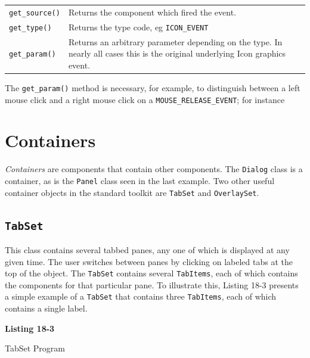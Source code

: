 \vspace{0.15in}
\begin{xtabular}{m{1.2in} m{4.7in}}
\texttt{get\_source()} & Returns the component which fired the event.\\
\texttt{get\_type()} & Returns the type code, eg \texttt{ICON\_EVENT}\\
\texttt{get\_param()} &
Returns an arbitrary parameter depending on the type. In
nearly all cases this is the original underlying Icon graphics event.\\
\end{xtabular}
\vspace{0.15in}

The \texttt{get\_param()} method is necessary, for example, to
distinguish between a left mouse click and a right mouse click on a
\texttt{MOUSE\_RELEASE\_EVENT}; for instance 


\section{Containers}

\textit{Containers} are components that contain other components.
The \texttt{Dialog} class is a container, as is
the \texttt{Panel} class seen in the last example.
Two other useful container objects in the standard toolkit are \texttt{TabSet}
and \texttt{OverlaySet}.

\subsection*{\texttt{TabSet}}

This class contains several tabbed panes, any one of which
is displayed at any given time. The user switches between panes by clicking on
labeled tabs at the top of the object. The \texttt{TabSet} contains several
\texttt{TabItems}, each of which contains the components for that particular
pane. To illustrate this, Listing 18-3 presents a simple example of a
\texttt{TabSet} that contains three \texttt{TabItems}, each of which contains a
single label.

\bigskip

{\sffamily\bfseries
Listing 18-3

TabSet Program}

